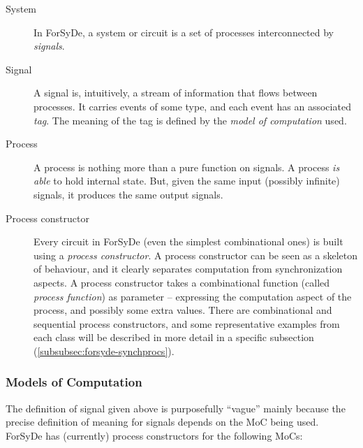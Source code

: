         \begin{description}
            \item[System] In ForSyDe, a system or circuit is a set of processes interconnected by
                \emph{signals}.

            \item[Signal] A signal is, intuitively, a stream of information that flows between
                processes. It carries events of some type, and each event has an associated
                \emph{tag}. The meaning of the tag is defined by the \emph{model of computation}
                used.

            \item[Process] A process is nothing more than a pure function on signals. A process
                \emph{is able} to hold internal state. But, given the same input (possibly infinite)
                signals, it produces the same output signals.

            \item[Process constructor] Every circuit in ForSyDe (even the simplest combinational
                ones) is built using a \emph{process constructor}. A process constructor can be seen
                as a skeleton of behaviour, and it clearly separates computation from
                synchronization aspects. A process constructor takes a combinational function
                (called \emph{process function}) as parameter -- expressing the computation aspect
                of the process, and possibly some extra values. There are combinational and
                sequential process constructors, and some representative examples from each class
                will be described in more detail in a specific subsection
                (\ref{subsubsec:forsyde-synchprocs}).
        \end{description}

        \subsubsection{Models of Computation}
        \label{subsubsec:forsyde-mocs}
            The definition of signal given above is purposefully ``vague'' mainly because the
            precise definition of meaning for signals depends on the \ac{MoC} being used.
            ForSyDe has (currently) process constructors for the following \acp{MoC}:


